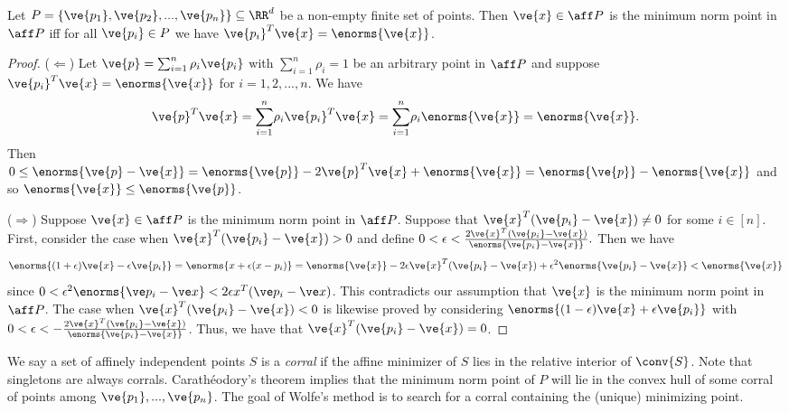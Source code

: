 \begin{lemma}\label{lem:affineoptimality}
Let $P = \{\ve{p_1},\ve{p_2},...,\ve{p_n}\} \subseteq \RR^d$ be a non-empty finite set of points. Then $\ve{x} \in \aff P$ is the minimum norm point in $\aff P$ iff for all $\ve{p_i} \in P$ we have $\ve{p_i}^T \ve{x} = \enorms{\ve{x}}$.
\end{lemma}
\begin{proof}
($\Leftarrow$) Let $\ve{p}= \sum_{i=1}^n \rho_i \ve{p_i}$ with $\sum_{i=1}^n \rho_i = 1$ be an arbitrary point in $\aff P$ and suppose $\ve{p_i}^T \ve{x} = \enorms{\ve{x}}$ for $i=1,2,...,n$.  
We have 
\[
\ve{p}^T \ve{x} = \underset{i=1}{\overset{n}{\sum}} \rho_i \ve{p_i}^T \ve{x} = \underset{i=1}{\overset{n}{\sum}}\rho_i\enorms{\ve{x}} = \enorms{\ve{x}}.
\]
Then $0 \le \enorms{\ve{p}-\ve{x}} = \enorms{\ve{p}} - 2\ve{p}^T \ve{x} + \enorms{\ve{x}} = \enorms{\ve{p}} - \enorms{\ve{x}}$ and so $\enorms{\ve{x}} \le \enorms{\ve{p}}$.

($\Rightarrow$) Suppose $\ve{x} \in \aff P$ is the minimum norm point in $\aff P$.  Suppose that $\ve{x}^T(\ve{p_i} - \ve{x}) \not= 0$ for some $i \in [n]$.  First, consider the case when $\ve{x}^T(\ve{p_i} - \ve{x}) > 0$ and define $0 < \epsilon < \frac{2\ve{x}^T(\ve{p_i}-\ve{x})}{\enorms{\ve{p_i} - \ve{x}}}.$  Then we have 
\[
\enorms{(1+\epsilon)\ve{x} - \epsilon \ve{p_i}} = \enorms{x + \epsilon(x - p_i)} = \enorms{\ve{x}} - 2\epsilon \ve{x}^T(\ve{p_i}-\ve{x}) +\epsilon^2 \enorms{\ve{p_i}-\ve{x}} < \enorms{\ve{x}}
\]  
since $0 < \epsilon^2 \enorms{\ve p_i - \ve x} < 2\epsilon x^T(\ve p_i - \ve x)$.  This contradicts our assumption that $\ve{x}$ is the minimum norm point in $\aff P$.  The case when $\ve{x}^T(\ve{p_i} -\ve{x}) < 0$ is likewise proved by considering $\enorms{(1-\epsilon)\ve{x} + \epsilon \ve{p_i}}$ with $0< \epsilon < -\frac{2\ve{x}^T(\ve{p_i}-\ve{x})}{\enorms{\ve{p_i} - \ve{x}}}$.  Thus, we have that $\ve{x}^T(\ve{p_i} - \ve{x}) = 0$.
\end{proof}

We say a set of affinely independent points $S$ is a \emph{corral} if the affine minimizer of $S$ 
lies in the relative interior of $\conv{S}$.
Note that singletons are always corrals. 
Carath{\'e}odory's theorem implies that the minimum norm point of $P$ will lie in the convex hull of some corral of points among $\ve{p_1},...,\ve{p_n}$.  
The goal of Wolfe's method is to search for a corral containing the (unique) minimizing point.

